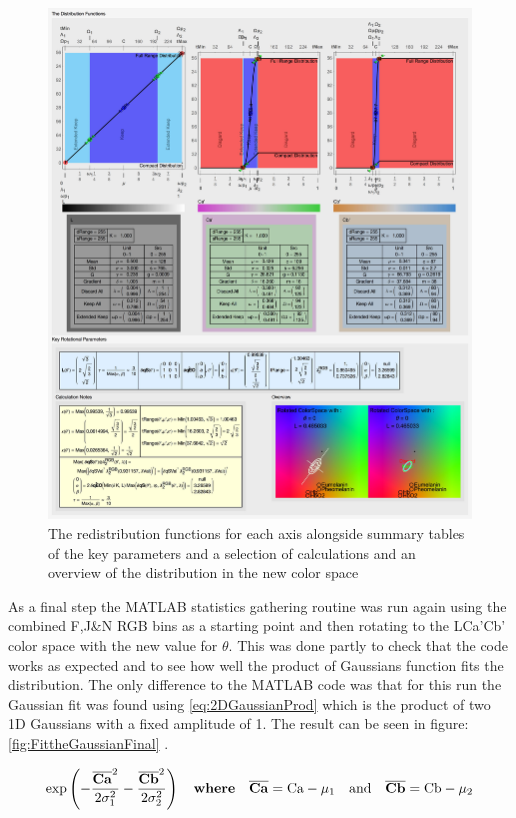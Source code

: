 \begin{figure}[h!]
  \centering
  \includegraphics[width=1.0 \textwidth]{Chapter3/Figs/Distribution_Results.jpg} 
    \caption{ The redistribution functions for each axis alongside summary tables of the key parameters and a selection of calculations and an overview of the distribution in the new color space  }  \label{fig:DistributionResults}
\end{figure}

As a final step the MATLAB statistics gathering routine was run again using the combined F,J\&N RGB bins as a starting point and then rotating to the LCa'Cb' color space with the new value for $\theta$. This was done partly to check that the code works as expected and to see how well the product of Gaussians function fits the distribution. The only difference to the MATLAB code was that for this run the Gaussian fit was found using  \ref{eq:2DGaussianProd} which is the product of two 1D Gaussians with a fixed amplitude of 1. The result can be seen in figure:\ref{fig:FittheGaussianFinal} . 

\begin{equation}\label{eq:2DGaussianProd}
\exp \left( -\frac{{\overline{\mathbf{Ca}}}^2}{2 \sigma_1^2} -  \frac{ { \overline{\mathbf{Cb}} }^2}{2 \sigma_2^2} \right) \quad \textbf{where} \quad \overline{\mathbf{Ca}} = \text{Ca}-\mu_1 \quad \text{and} \quad \overline{\mathbf{Cb}} = \text{Cb}-\mu_2 
\end{equation}



